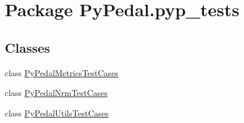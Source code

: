 \hypertarget{namespacePyPedal_1_1pyp__tests}{
\section{Package Py\-Pedal.pyp\_\-tests}
\label{namespacePyPedal_1_1pyp__tests}
}


\subsection*{Classes}
\begin{CompactItemize}
\item 
class \hyperlink{classPyPedal_1_1pyp__tests_1_1PyPedalMetricsTestCases}{Py\-Pedal\-Metrics\-Test\-Cases}
\item 
class \hyperlink{classPyPedal_1_1pyp__tests_1_1PyPedalNrmTestCases}{Py\-Pedal\-Nrm\-Test\-Cases}
\item 
class \hyperlink{classPyPedal_1_1pyp__tests_1_1PyPedalUtilsTestCases}{Py\-Pedal\-Utils\-Test\-Cases}
\end{CompactItemize}
